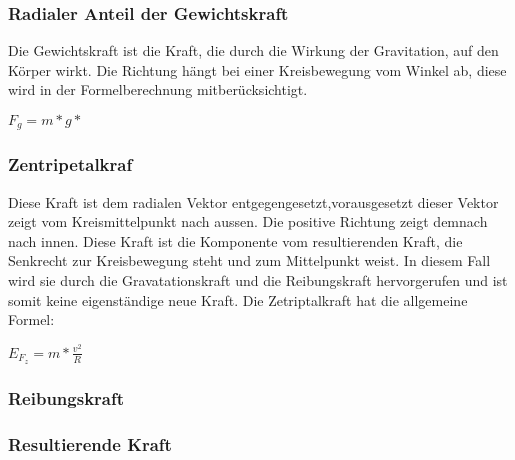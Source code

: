 \documentclass[../main.tex]{subfiles}
\begin{document}
\subsubsection{Radialer Anteil der Gewichtskraft}
Die Gewichtskraft ist die Kraft, die durch die Wirkung der Gravitation, auf den Körper wirkt. Die Richtung hängt bei einer Kreisbewegung vom Winkel ab, diese wird in der Formelberechnung mitberücksichtigt.
\begin{mdframed}
$F_g = m * g *$
\end{mdframed}
\subsubsection{Zentripetalkraf}
Diese Kraft ist dem radialen Vektor entgegengesetzt,vorausgesetzt dieser Vektor zeigt vom Kreismittelpunkt nach aussen. Die positive Richtung zeigt demnach nach innen. Diese Kraft ist die Komponente vom resultierenden Kraft, die Senkrecht zur Kreisbewegung steht und zum Mittelpunkt weist. In diesem Fall wird sie durch die Gravatationskraft und die Reibungskraft hervorgerufen und ist somit keine eigenständige neue Kraft.
Die Zetriptalkraft hat die allgemeine Formel:
\begin{mdframed}
$E_{F_z}=m * \frac{v^2}{R} $
\end{mdframed}

\subsubsection{Reibungskraft}
\subsubsection{Resultierende Kraft}
\end{document}
